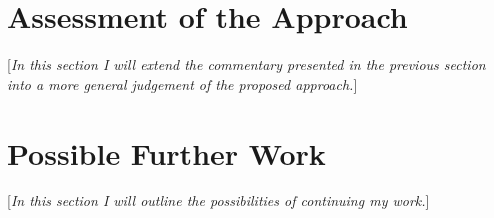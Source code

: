 \documentclass{pracamgr}
\begin{document}
\section{Assessment of the Approach}
[\textit{In this section I will extend the commentary presented in the previous section into a more general judgement of the proposed approach.}]

\section{Possible Further Work}
[\textit{In this section I will outline the possibilities of continuing my work.}]

\printbibliography[heading=bibintoc]
\end{document}

